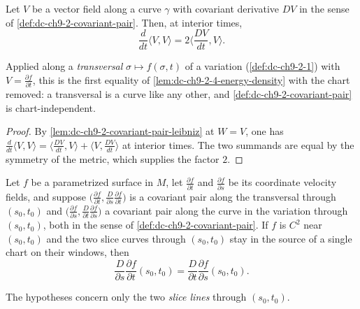 \begin{lemma}
  \label{lem:dc-ch9-2-4-density-self}
  \leanok
  Let $V$ be a vector field along a curve $\gamma$ with covariant derivative $DV$ in the
  sense of \cref{def:dc-ch9-2-covariant-pair}. Then, at interior times,
  $$
  \frac{d}{dt}\langle V,V\rangle = 2\Big\langle\frac{DV}{dt},V\Big\rangle.
  $$

  Applied along a \emph{transversal} $\sigma\mapsto f(\sigma,t)$ of a variation
  (\cref{def:dc-ch9-2-1}) with $V=\frac{\partial f}{\partial t}$, this is the first
  equality of \cref{lem:dc-ch9-2-4-energy-density} with the chart removed: a transversal is
  a curve like any other, and \cref{def:dc-ch9-2-covariant-pair} is chart-independent.
\end{lemma}
\begin{proof}
  \leanok
  \sketch
  By \cref{lem:dc-ch9-2-covariant-pair-leibniz} at $W=V$, one has
  $\frac{d}{dt}\langle V,V\rangle
  =\langle\frac{DV}{dt},V\rangle+\langle V,\frac{DV}{dt}\rangle$ at interior times. The two
  summands are equal by the symmetry of the metric, which supplies the factor $2$.

\end{proof}
\begin{lemma}
  \label{lem:dc-ch9-2-4-symmetry-manifold}
  \leanok
  Let $f$ be a parametrized surface in $M$, let $\frac{\partial f}{\partial t}$ and
  $\frac{\partial f}{\partial s}$ be its coordinate velocity fields, and suppose
  $\big(\frac{\partial f}{\partial t},\frac{D}{\partial s}\frac{\partial f}{\partial t}\big)$
  is a covariant pair along the transversal through $(s_0,t_0)$ and
  $\big(\frac{\partial f}{\partial s},\frac{D}{\partial t}\frac{\partial f}{\partial s}\big)$
  a covariant pair along the curve in the variation through $(s_0,t_0)$, both in the sense
  of \cref{def:dc-ch9-2-covariant-pair}. If $f$ is $C^2$ near $(s_0,t_0)$ and the two slice
  curves through $(s_0,t_0)$ stay in the source of a single chart on their windows, then
  $$
  \frac{D}{\partial s}\frac{\partial f}{\partial t}(s_0,t_0)
    = \frac{D}{\partial t}\frac{\partial f}{\partial s}(s_0,t_0).
  $$

  The hypotheses concern only the two \emph{slice lines} through $(s_0,t_0)$.
\end{lemma}
